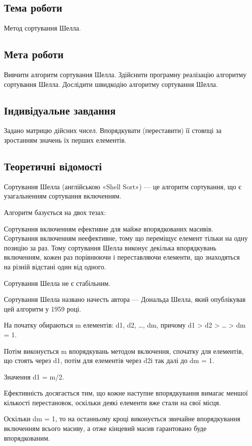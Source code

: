 \documentclass[12pt]{extarticle}
\begin{document}
\subsection*{Тема роботи} 
Метод сортування Шелла.

\subsection*{Мета роботи} Вивчити алгоритм сортування Шелла. 
Здійснити програмну реалізацію алгоритму сортування Шелла. 
Дослідити швидкодію алгоритму сортування Шелла.

\subsection*{Індивідуальне завдання}
Задано матрицю дійсних чисел. Впорядкувати (переставити) її стовпці за зростанням значень їх перших елементів.

\subsection*{Теоретичні відомості}
Сортування Шелла (англійською «Shell Sort») — це алгоритм сортування, що є узагальненням сортування включенням.

Алгоритм базується на двох тезах:

Сортування включенням ефективне для майже впорядкованих масивів.
Сортування включенням неефективне, тому що переміщує елемент тільки на одну позицію за раз.
Тому сортування Шелла виконує декілька впорядкувань включенням, кожен раз порівнюючи і переставляючи елементи, що знаходяться на різній відстані один від одного.

Сортування Шелла не є стабільним.

Сортування Шелла названо начесть автора — Дональда Шелла, який опублікував цей алгоритм у 1959 році. 

На початку обираються m елементів: d1, d2, …, dm, причому d1 > d2 > … > dm = 1.

Потім виконується m впорядкувань методом включення, спочатку для елементів, що стоять через d1, потім для елементів через d2і так далі до dm = 1.

Значення   d1  = m/2.

Ефективність досягається тим, що кожне наступне впорядкування вимагає меншої кількості перестановок, оскільки деякі елементи вже стали на свої місця.

Оскільки dm = 1, то на останньому кроці виконується звичайне впорядкування включенням всього масиву, а отже кінцевий масив гарантовано буде впорядкованим.
\end{document}
